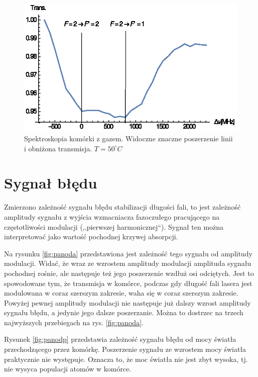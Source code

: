 \documentclass[a4paper,10pt]{article}
\begin{document}
\begin{figure}[h!]
\centering
 \includegraphics[width=\textwidth]{spek_gaz.eps}
 \caption{Spektroskopia komórki z gazem. Widoczne znaczne poszerzenie linii i obniżona transmisja. $T=50^{\circ}C$}
 \label{fig:spekgaz}
\end{figure}


\section{Sygnał błędu}

Zmierzono zależność sygnału błędu stabilizacji długości fali, to jest zależność amplitudy sygnału z wyjścia wzmacniacza fazoczułego pracującego na częstotliwości modulacji (,,pierwszej harmonicznej``). Sygnał ten można interpretować jako wartość pochodnej krzywej absorpcji.

Na rysunku \ref{fig:panoda} przedstawiona jest zależność tego sygnału od amplitudy modulacji. Widać, że wraz ze wzrostem amplitudy modulacji amplituda sygnału pochodnej rośnie, ale następuje też jego poszerzenie wzdłuż osi odciętych. Jest to spowodowane tym, że transmisja w komórce, podczas gdy długość fali lasera jest modulowana w coraz szerszym zakresie, waha się w coraz szerszym zakresie. Powyżej pewnej amplitudy modulacji nie następuje już dalszy wzrost amplitudy sygnału błędu, a jedynie jego dalsze poszerzanie. Można to dostrzec na trzech najwyższych przebiegach na rys. \ref{fig:panoda}.

Rysunek \ref{fig:panodp} przedstawia zależność sygnału błędu od mocy światła przechodzącego przez komórkę. Poszerzenie sygnału ze wzrostem mocy światła praktycznie nie występuje. Oznacza to, że moc światła nie jest zbyt wysoka, tj. nie wysyca populacji atomów w komórce.
\end{document}
